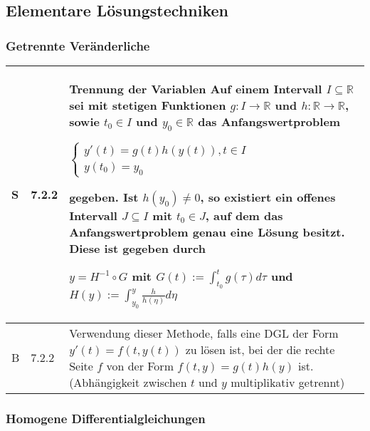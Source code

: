 \subsection{Elementare Lösungstechniken}
\subsubsection{Getrennte Veränderliche}

    \begin{longtable}{p{0.75cm} p{1cm} p{16cm}}
        \toprule

        S   & 7.2.2 &   \textbf{Trennung der Variablen} \hfill \break
                        Auf einem Intervall $I \subseteq \mathbb{R}$ sei mit stetigen Funktionen $g: I \rightarrow \mathbb{R}$ und 
                        $h: \mathbb{R} \rightarrow \mathbb{R}$, sowie $t_0 \in I$ und $y_0 \in \mathbb{R}$ das Anfangswertproblem \hfill \break
                        \centerline{$   \begin{cases}
                                            y'(t) = g(t) h(y(t)), t\in I \\
                                            y(t_0) = y_0
                                        \end{cases}$}
                        gegeben. Ist $h(y_0) \neq 0$, so existiert ein offenes Intervall $J \subseteq I$ mit $t_0 \in J$, auf dem
                        das Anfangswertproblem genau eine Lösung besitzt. Diese ist gegeben durch \hfill \break
                        \centerline{$ y = H^{-1} \circ G$ mit $G(t) := \int^t_{t_0} g(\tau) d\tau$ und $H(y) := \int^y_{y_0} \frac{h}{h(\eta)}d\eta  $} \\
        \midrule
        B   & 7.2.2 &   Verwendung dieser Methode, falls eine DGL der Form $y'(t) = f(t,y(t))$ zu lösen ist, bei der die rechte Seite $f$ von der
                        Form $f(t,y) = g(t)h(y)$ ist. (Abhängigkeit zwischen $t$ und $y$ multiplikativ getrennt) \\
        \bottomrule
    \end{longtable}

\subsubsection{Homogene Differentialgleichungen}

